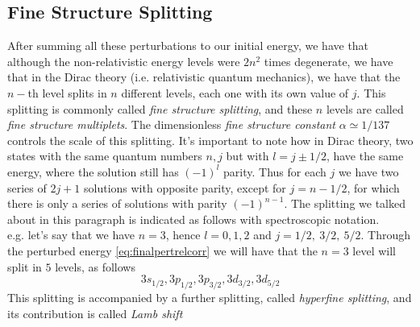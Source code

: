 \documentclass[../qm.tex]{subfiles}
\begin{document}
	\subsection{Fine Structure Splitting}
	After summing all these perturbations to our initial energy, we have that although the non-relativistic energy levels were $2n^2$ times degenerate, we have that in the Dirac theory (i.e. relativistic quantum mechanics), we have that the $n-$th level splits in $n$ different levels, each one with its own value of $j$. This splitting is commonly called \textit{fine structure splitting}, and these $n$ levels are called \textit{fine structure multiplets}. The dimensionless \textit{fine structure constant} $\alpha\simeq1/137$ controls the scale of this splitting. It's important to note how in Dirac theory, two states with the same quantum numbers $n,j$ but with $l=j\pm1/2$, have the same energy, where the solution still has $(-1)^l$ parity. Thus for each $j$ we have two series of $2j+1$ solutions with opposite parity, except for $j=n-1/2$, for which there is only a series of solutions with parity $(-1)^{n-1}$. The splitting we talked about in this paragraph is indicated as follows with spectroscopic notation.\\
	e.g. let's say that we have $n=3$, hence $l=0,1,2$ and $j=1/2,\ 3/2,\ 5/2$. Through the perturbed energy \eqref{eq:finalpertrelcorr} we will have that the $n=3$ level will split in $5$ levels, as follows
	\begin{equation*}
		3s_{1/2},3p_{1/2},3p_{3/2},3d_{3/2},3d_{5/2}
	\end{equation*}
	This splitting is accompanied by a further splitting, called \textit{hyperfine splitting}, and its contribution is called \textit{Lamb shift}
\end{document}
